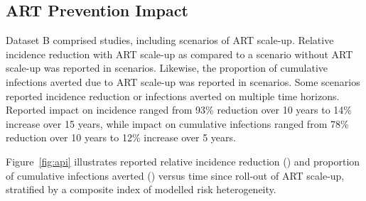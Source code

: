 \subsection{ART Prevention Impact}
\label{ss:res:api}
Dataset B comprised  studies,
including  scenarios of ART scale-up.
Relative incidence reduction with ART scale-up
as compared to a scenario without ART scale-up
was reported in  scenarios.
Likewise, the proportion of cumulative infections averted due to ART scale-up
was reported in  scenarios.
Some scenarios reported incidence reduction or infections averted
on multiple time horizons.
Reported impact on incidence ranged from %
93\% reduction over 10 years\cite{Granich2009} to
14\% increase over 15 years,\cite{Salomon2005}
while impact on cumulative infections ranged from
78\% reduction over 10 years\cite{Abbas2006} to
12\% increase over 5 years.\cite{Barnighausen2016}
\par
Figure~\ref{fig:api} illustrates reported
relative incidence reduction () and
proportion of cumulative infections averted ()
versus time since roll-out of ART scale-up,
stratified by a composite index of modelled risk heterogeneity.
